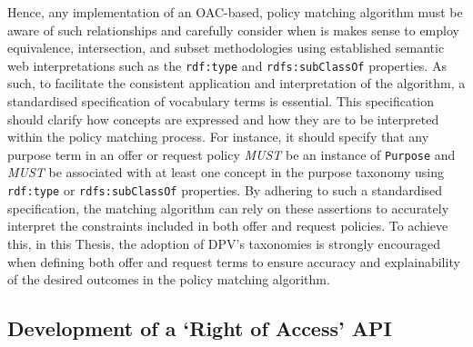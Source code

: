 \begin{table}[ht]
{\begin{tabular}{c|c|c||c|c||c|c}
\end{tabular}}
\end{table}

Hence, any implementation of an OAC-based, policy matching algorithm must be aware of such relationships and carefully consider when is makes sense to employ equivalence, intersection, and subset methodologies using established semantic web interpretations such as the \texttt{rdf:type} and \texttt{rdfs:subClassOf} properties.
As such, to facilitate the consistent application and interpretation of the algorithm, a standardised specification of vocabulary terms is essential.
This specification should clarify how concepts are expressed and how they are to be interpreted within the policy matching process.
For instance, it should specify that any purpose term in an offer or request policy \textit{MUST} be an instance of \texttt{Purpose} and \textit{MUST} be associated with at least one concept in the purpose taxonomy using \texttt{rdf:type} or \texttt{rdfs:subClassOf} properties.
By adhering to such a standardised specification, the matching algorithm can rely on these assertions to accurately interpret the constraints included in both offer and request policies.
To achieve this, in this Thesis, the adoption of DPV's taxonomies is strongly encouraged when defining both offer and request terms to ensure accuracy and explainability of the desired outcomes in the policy matching algorithm.

\subsection{Development of a `Right of Access' API}
\label{sec:right-api}


